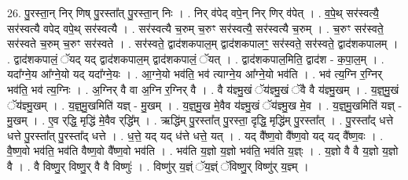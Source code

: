 \documentclass[17pt]{extarticle}
\begin{document}
26. पु॒रस्ता॒न् निर् णिष् पु॒रस्ता᳚त् पु॒रस्ता॒न् निः । . निर् व॑पेद् वपे॒न् निर् णिर् व॑पेत् । . व॒पे॒थ् सर॑स्वत्यै॒ सर॑स्वत्यै वपेद् वपे॒थ् सर॑स्वत्यै । . सर॑स्वत्यै च॒रुम् च॒रुꣳ सर॑स्वत्यै॒ सर॑स्वत्यै च॒रुम् । . च॒रुꣳ सर॑स्वते॒ सर॑स्वते च॒रुम् च॒रुꣳ सर॑स्वते । . सर॑स्वते॒ द्वाद॑शकपाल॒म् द्वाद॑शकपालꣳ॒॒ सर॑स्वते॒ सर॑स्वते॒ द्वाद॑शकपालम् । . द्वाद॑शकपालं॒ ॅयद् यद् द्वाद॑शकपाल॒म् द्वाद॑शकपालं॒ ॅयत् । . द्वाद॑शकपाल॒मिति॒ द्वाद॑श - क॒पा॒ल॒म् । . यदा᳚ग्ने॒य आ᳚ग्ने॒यो यद् यदा᳚ग्ने॒यः । . आ॒ग्ने॒यो भव॑ति॒ भव॑ त्याग्ने॒य आ᳚ग्ने॒यो भव॑ति । . भव॑ त्य॒ग्नि र॒ग्निर् भव॑ति॒ भव॑ त्य॒ग्निः । . अ॒ग्निर् वै वा अ॒ग्नि र॒ग्निर् वै । . वै य॑ज्ञ्मु॒खं ॅय॑ज्ञ्मु॒खं ॅवै वै य॑ज्ञ्मु॒खम् । . य॒ज्ञ्॒मु॒खं ॅय॑ज्ञ्मु॒खम् । . य॒ज्ञ्॒मु॒खमिति॑ यज्ञ् - मु॒खम् । . य॒ज्ञ्॒मु॒ख मे॒वैव य॑ज्ञ्मु॒खं ॅय॑ज्ञ्मु॒ख मे॒व । . य॒ज्ञ्॒मु॒खमिति॑ यज्ञ् - मु॒खम् । . ए॒व र्‌द्धि॒ मृद्धि॑ मे॒वैव र्‌द्धि᳚म् । . ऋद्धि॑म् पु॒रस्ता᳚त् पु॒रस्ता॒ दृद्धि॒ मृद्धि॑म् पु॒रस्ता᳚त् । . पु॒रस्ता᳚द् धत्ते धत्ते पु॒रस्ता᳚त् पु॒रस्ता᳚द् धत्ते । . ध॒त्ते॒ यद् यद् ध॑त्ते धत्ते॒ यत् । . यद् वै᳚ष्ण॒वो वै᳚ष्ण॒वो यद् यद् वै᳚ष्ण॒वः । . वै॒ष्ण॒वो भव॑ति॒ भव॑ति वैष्ण॒वो वै᳚ष्ण॒वो भव॑ति । . भव॑ति य॒ज्ञो य॒ज्ञो भव॑ति॒ भव॑ति य॒ज्ञ्ः । . य॒ज्ञो वै वै य॒ज्ञो य॒ज्ञो वै । . वै विष्णु॒र् विष्णु॒र् वै वै विष्णुः॑ । . विष्णु॑र् य॒ज्ञ्ं ॅय॒ज्ञ्ं ॅविष्णु॒र् विष्णु॑र् य॒ज्ञ्म् । \newline
\end{document}
